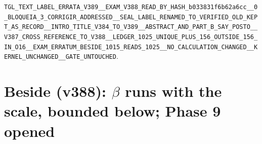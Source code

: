 \documentclass[11pt]{article}
\theoremstyle{definition}\newtheorem{deriv}{Derivation}
\begin{document}
\texttt{TGL\_\allowbreak{}TEXT\_\allowbreak{}LABEL\_\allowbreak{}ERRATA\_\allowbreak{}V389\_\allowbreak{}\_\allowbreak{}EXAM\_\allowbreak{}V388\_\allowbreak{}READ\_\allowbreak{}BY\_\allowbreak{}HASH\_\allowbreak{}b033831f6b62a6cc\_\allowbreak{}\_\allowbreak{}0\_\allowbreak{}BLOQUEIA\_\allowbreak{}3\_\allowbreak{}CORRIGIR\_\allowbreak{}ADDRESSED\_\allowbreak{}\_\allowbreak{}SEAL\_\allowbreak{}LABEL\_\allowbreak{}RENAMED\_\allowbreak{}TO\_\allowbreak{}VERIFIED\_\allowbreak{}OLD\_\allowbreak{}KEPT\_\allowbreak{}AS\_\allowbreak{}RECORD\_\allowbreak{}\_\allowbreak{}INTRO\_\allowbreak{}TITLE\_\allowbreak{}V384\_\allowbreak{}TO\_\allowbreak{}V389\_\allowbreak{}\_\allowbreak{}ABSTRACT\_\allowbreak{}AND\_\allowbreak{}PART\_\allowbreak{}B\_\allowbreak{}SAY\_\allowbreak{}POSTO\_\allowbreak{}\_\allowbreak{}V387\_\allowbreak{}CROSS\_\allowbreak{}REFERENCE\_\allowbreak{}TO\_\allowbreak{}V388\_\allowbreak{}\_\allowbreak{}LEDGER\_\allowbreak{}1025\_\allowbreak{}UNIQUE\_\allowbreak{}PLUS\_\allowbreak{}156\_\allowbreak{}OUTSIDE\_\allowbreak{}156\_\allowbreak{}IN\_\allowbreak{}O16\_\allowbreak{}\_\allowbreak{}EXAM\_\allowbreak{}ERRATUM\_\allowbreak{}BESIDE\_\allowbreak{}1015\_\allowbreak{}READS\_\allowbreak{}1025\_\allowbreak{}\_\allowbreak{}NO\_\allowbreak{}CALCULATION\_\allowbreak{}CHANGED\_\allowbreak{}\_\allowbreak{}KERNEL\_\allowbreak{}UNCHANGED\_\allowbreak{}\_\allowbreak{}GATE\_\allowbreak{}UNTOUCHED}.

\section*{Beside (v388): $\beta$ runs with the scale, bounded below; Phase 9 opened}

\end{document}
